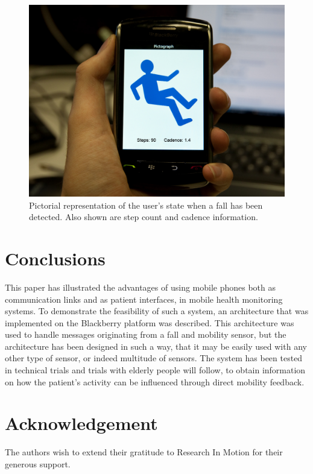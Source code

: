 \documentclass[conference,a4paper]{IEEEtran}
\begin{document}
\begin{figure}
\centering
\includegraphics[scale=0.245]{./figures/storm-mod.png}
\caption{Pictorial representation of the user's state when a fall has been detected. Also shown are step count and cadence information.}
\label{MobilityInterface.fig}
\end{figure}

\section{Conclusions\label{Conclusions.sec}}
This paper has illustrated the advantages of using mobile phones both as communication links and as patient interfaces, in mobile health monitoring systems. To demonstrate the feasibility of such a system, an architecture that was implemented on the Blackberry platform was described. This architecture was used to handle messages originating from a fall and mobility sensor, but the architecture has been designed in such a way, that it may be easily used with any other type of sensor, or indeed multitude of sensors. The system has been tested in technical trials and trials with elderly people will follow, to obtain information on how the patient's activity can be influenced through direct mobility feedback.

\section*{Acknowledgement}
The authors wish to extend their gratitude to Research In Motion for their generous support.
\end{document}
